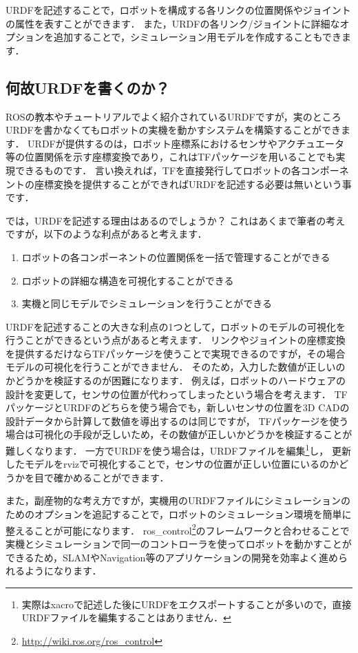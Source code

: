 \documentclass[{../../master}]{subfiles}
\begin{document}
URDFを記述することで，ロボットを構成する各リンクの位置関係やジョイントの属性を表すことができます．
また，URDFの各リンク/ジョイントに詳細なオプションを追加することで，シミュレーション用モデルを作成することもできます．

\subsection{何故URDFを書くのか？}

ROSの教本やチュートリアルでよく紹介されているURDFですが，実のところURDFを書かなくてもロボットの実機を動かすシステムを構築することができます．
URDFが提供するのは，ロボット座標系におけるセンサやアクチュエータ等の位置関係を示す座標変換であり，これはTFパッケージを用いることでも実現できるものです．
言い換えれば，TFを直接発行してロボットの各コンポーネントの座標変換を提供することができればURDFを記述する必要は無いという事です．

では，URDFを記述する理由はあるのでしょうか？
これはあくまで筆者の考えですが，以下のような利点があると考えます．

\begin{enumerate}
  \item ロボットの各コンポーネントの位置関係を一括で管理することができる
  \item ロボットの詳細な構造を可視化することができる
  \item 実機と同じモデルでシミュレーションを行うことができる
\end{enumerate}

URDFを記述することの大きな利点の1つとして，ロボットのモデルの可視化を行うことができるという点があると考えます．
リンクやジョイントの座標変換を提供するだけならTFパッケージを使うことで実現できるのですが，その場合モデルの可視化を行うことができません．
そのため，入力した数値が正しいのかどうかを検証するのが困難になります．
例えば，ロボットのハードウェアの設計を変更して，センサの位置が代わってしまったという場合を考えます．
TFパッケージとURDFのどちらを使う場合でも，新しいセンサの位置を3D CADの設計データから計算して数値を導出するのは同じですが，
TFパッケージを使う場合は可視化の手段が乏しいため，その数値が正しいかどうかを検証することが難しくなります．
一方でURDFを使う場合は，URDFファイルを編集\footnote{実際は\textsf{xacro}で記述した後にURDFをエクスポートすることが多いので，直接URDFファイルを編集することはありません．}し，
更新したモデルを\textsf{rviz}で可視化することで，センサの位置が正しい位置にいるのかどうかを目で確かめることができます．

また，副産物的な考え方ですが，実機用のURDFファイルにシミュレーションのためのオプションを追記することで，ロボットのシミュレーション環境を簡単に整えることが可能になります．
\textsf{ros\_control}\footnote{\url{http://wiki.ros.org/ros_control}}のフレームワークと合わせることで実機とシミュレーションで同一のコントローラを使ってロボットを動かすことができるため，SLAMやNavigation等のアプリケーションの開発を効率よく進められるようになります．
\end{document}
